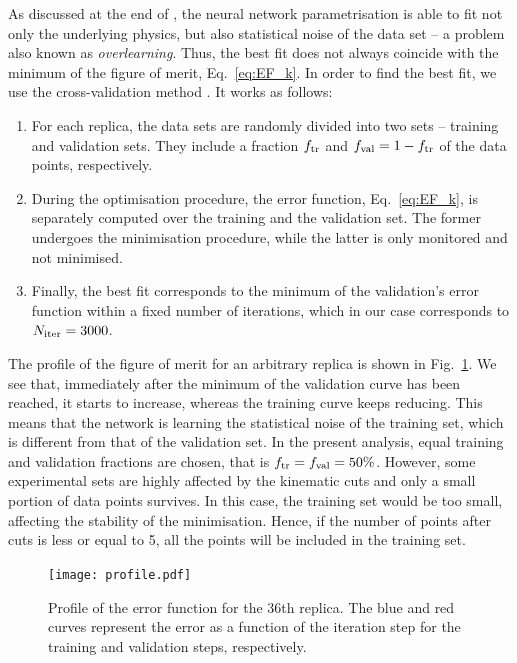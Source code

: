 As discussed at the end of , the neural network parametrisation is able to fit not only the underlying physics, but also statistical noise of the data set -- a problem also known as \textit{overlearning}. Thus, the best fit does not always coincide with the minimum of the figure of merit, Eq.~\eqref{eq:EF_k}. In order to find the best fit, we use the cross-validation method \cite{pml1Book}. It works as follows:
\begin{enumerate}
  \item For each replica, the data sets are randomly divided into two sets -- training and validation sets. They include a fraction $f_{\textrm{tr}}$ and $f_{\textrm{val}} = 1 - f_{\textrm{tr}}$ of the data points, respectively.
  \item During the optimisation procedure, the error function, Eq.~\eqref{eq:EF_k}, is separately computed over the training and the validation set. The former undergoes the minimisation procedure, while the latter is only monitored and not minimised.
  \item Finally, the best fit corresponds to the minimum of the validation's error function within a fixed number of iterations, which in our case corresponds to $N_{\textrm{iter}} = 3000$.
\end{enumerate}
The profile of the figure of merit for an arbitrary replica is shown in Fig.~\ref{fig:profile}. We see that, immediately after the minimum of the validation curve has been reached, it starts to increase, whereas the training curve keeps reducing. This means that the network is learning the statistical noise of the training set, which is different from that of the validation set. In the present analysis, equal training and validation fractions are chosen, that is $f_{\textrm{tr}} = f_{\textrm{val}} = 50\%$. However, some experimental sets are highly affected by the kinematic cuts and only a small portion of data points survives. In this case, the training set would be too small, affecting the stability of the minimisation. Hence, if the number of points after cuts is less or equal to 5, all the points will be included in the training set.

\begin{figure}[t]
  \centering
  \texttt{[image: profile.pdf]} 
  \caption{\small{Profile of the error function for the 36th replica. The blue and red curves represent the error as a function of the iteration step for the training and validation steps, respectively.}}
  \label{fig:profile}
\end{figure}

